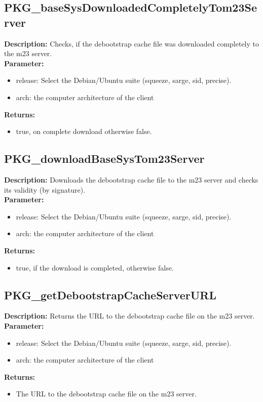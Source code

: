 \subsection{PKG\_baseSysDownloadedCompletelyTom23Server}
\textbf{Description:} Checks, if the debootstrap cache file was downloaded completely to the m23 server.\\
\textbf{Parameter:}
\begin{itemize}
\item release: Select the Debian/Ubuntu suite (squeeze, sarge, sid, precise).
\item arch: the computer architecture of the client
\end{itemize}
\textbf{Returns:}
\begin{itemize}
\item true, on complete download otherwise false.
\end{itemize}

\subsection{PKG\_downloadBaseSysTom23Server}
\textbf{Description:} Downloads the debootstrap cache file to the m23 server and checks its validity (by signature).\\
\textbf{Parameter:}
\begin{itemize}
\item release: Select the Debian/Ubuntu suite (squeeze, sarge, sid, precise).
\item arch: the computer architecture of the client
\end{itemize}
\textbf{Returns:}
\begin{itemize}
\item true, if the download is completed, otherwise false.
\end{itemize}

\subsection{PKG\_getDebootstrapCacheServerURL}
\textbf{Description:} Returns the URL to the debootstrap cache file on the m23 server.\\
\textbf{Parameter:}
\begin{itemize}
\item release: Select the Debian/Ubuntu suite (squeeze, sarge, sid, precise).
\item arch: the computer architecture of the client
\end{itemize}
\textbf{Returns:}
\begin{itemize}
\item The URL to the debootstrap cache file on the m23 server.
\end{itemize}

